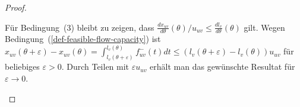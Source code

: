 \begin{proof}
\begin{description}
		Für Bedingung~(3) bleibt zu zeigen, dass $\frac{dx_{uv}}{d\theta}(\theta) /u_{uv}\leq \frac{dl_v}{d\theta}(\theta)$ gilt.
		Wegen Bedingung~(\ref{def-feasible-flow-capacity}) ist $x_{uv}(\theta + \varepsilon)-x_{uv}(\theta) = \int_{l_v(\theta+\varepsilon)}^{l_v(\theta)} f_{uv}^-(t) dt\leq (l_v(\theta + \varepsilon) - l_v(\theta)) u_{uv}$ für beliebiges $\varepsilon > 0$.
		Durch Teilen mit $\varepsilon u_{uv}$ erhält man das gewünschte Resultat für $\varepsilon \rightarrow 0$.
	\end{description}	
\end{proof}
